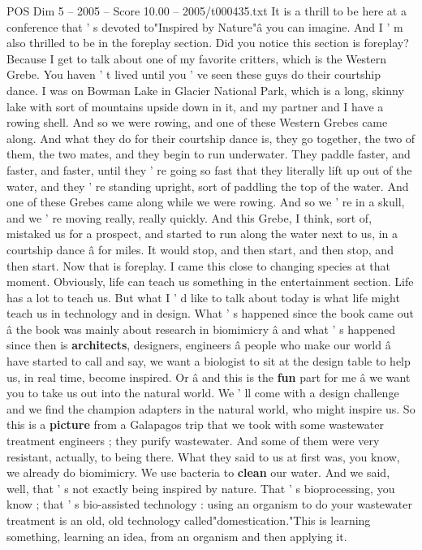 \begin{textsample}{POS Dim 5 – 2005 – Score 10.00 – 2005/t000435.txt}  \label{ex:f5_pos_007}
It is a thrill to be here at a conference that ' s devoted to"Inspired by Nature"â you can imagine.
And I ' m also thrilled to be in the foreplay section.
Did you notice this section is foreplay?
Because I get to talk about one of my favorite critters, which is the Western Grebe.
You haven ' t lived until you ' ve seen these guys do their courtship dance.
I was on Bowman Lake in Glacier National Park, which is a long, skinny lake with sort of mountains upside down in it, and my partner and I have a rowing shell.
And so we were rowing, and one of these Western Grebes came along.
And what they do for their courtship dance is, they go together, the two of them, the two mates, and they begin to run underwater.
They paddle faster, and faster, and faster, until they ' re going so fast that they literally lift up out of the water, and they ' re standing upright, sort of paddling the top of the water.
And one of these Grebes came along while we were rowing.
And so we ' re in a skull, and we ' re moving really, really quickly.
And this Grebe, I think, sort of, mistaked us for a prospect, and started to run along the water next to us, in a courtship dance â for miles.
It would stop, and then start, and then stop, and then start.
Now that is foreplay.
I came this close to changing species at that moment.
Obviously, life can teach us something in the entertainment section.
Life has a lot to teach us.
But what I ' d like to talk about today is what life might teach us in technology and in design.
What ' s happened since the book came out â the book was mainly about research in biomimicry â and what ' s happened since then is \textbf{architects}, designers, engineers â people who make our world â have started to call and say, we want a biologist to sit at the design table to help us, in real time, become inspired.
Or â and this is the \textbf{fun} part for me â we want you to take us out into the natural world.
We ' ll come with a design challenge and we find the champion adapters in the natural world, who might inspire us.
So this is a \textbf{picture} from a Galapagos trip that we took with some wastewater treatment engineers ; they purify wastewater.
And some of them were very resistant, actually, to being there.
What they said to us at first was, you know, we already do biomimicry.
We use bacteria to \textbf{clean} our water.
And we said, well, that ' s not exactly being inspired by nature.
That ' s bioprocessing, you know ; that ' s bio-assisted technology : using an organism to do your wastewater treatment is an old, old technology called"domestication."This is learning something, learning an idea, from an organism and then applying it.

\end{textsample}

